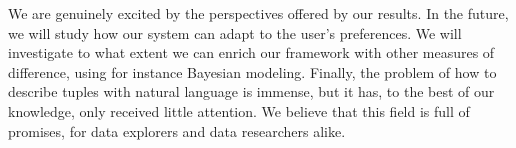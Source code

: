 We are genuinely excited by the perspectives offered by our results. In the
future, we will study how our system can adapt to the user's preferences. We
will investigate to what extent we can enrich our framework with other measures
of difference, using for instance Bayesian modeling. Finally, the problem of
how to describe tuples with natural language is immense, but it has, to the
best of our knowledge, only received little attention. We believe that this
field is full of promises, for data explorers and data researchers alike.


%
%


